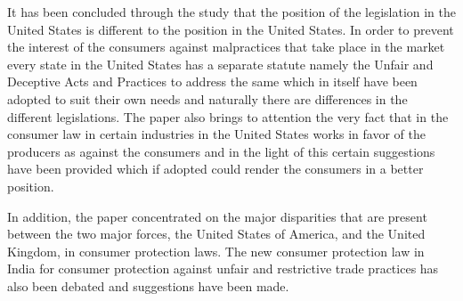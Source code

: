 \begin{multicols}{2}
\noi
It has been concluded through the study that the position of the legislation in the United States
 is different to the position in the United States. In order to prevent the interest of the
consumers against malpractices that take place in the market every state in the United States
has a separate statute namely the Unfair and Deceptive Acts and Practices to address the same
which in itself have been adopted to suit their own needs and naturally there are differences in
the different legislations. The paper also brings to attention the very fact that in the consumer
law in certain industries in the United States works in favor of the producers as against the
consumers and in the light of this certain suggestions have been provided which if adopted
could render the consumers in a better position.

\noi
In addition, the paper concentrated on the major disparities that are present between the two major forces, the United States of America, and the United Kingdom, in consumer protection laws. The new consumer protection law in India for consumer protection against unfair and restrictive trade practices has also been debated and suggestions have been made.
\end{multicols}

\label{end2017-art1}

